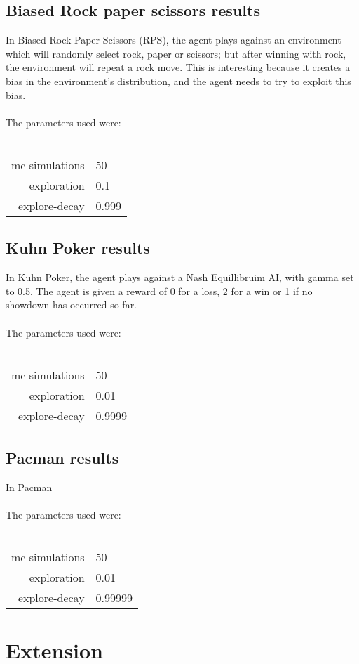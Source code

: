 \documentclass[pdftex,twoside,a4paper]{report}
\begin{document}
\section{Biased Rock paper scissors results}
In Biased Rock Paper Scissors (RPS), the agent plays against an environment which will randomly select rock, paper or scissors; but after winning with rock, the environment will repeat a rock move. This is interesting because it creates a bias in the environment's distribution, and the agent needs to try to exploit this bias.\\\\
The parameters used were:\\\\
\begin{tabular}{| r | l | }
\hline
mc-simulations & 50\\
exploration & 0.1\\
explore-decay & 0.999\\
\hline
\end{tabular}
\section{Kuhn Poker results}
In Kuhn Poker, the agent plays against a Nash Equillibruim AI, with gamma set to 0.5. The agent is given a reward of 0 for a loss, 2 for a win or 1 if no showdown has occurred so far.\\\\
The parameters used were:\\\\
\begin{tabular}{| r | l | }
\hline
mc-simulations & 50\\
exploration & 0.01\\
explore-decay & 0.9999\\
\hline
\end{tabular}
\section{Pacman results}
In Pacman\\\\
The parameters used were:\\\\
\begin{tabular}{| r | l | }
\hline
mc-simulations & 50\\
exploration & 0.01\\
explore-decay & 0.99999\\
\hline
\end{tabular}

\chapter{Extension}



\end{document}
